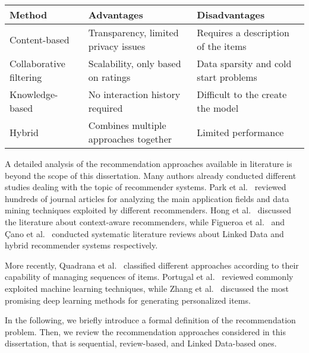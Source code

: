 \begin{table}
\centering
\begin{tabular}{@{}lp{4cm}p{4cm}@{}}
\toprule
Method & Advantages & Disadvantages \\ \midrule
Content-based & Transparency, limited privacy issues & Requires a description of the items \\
Collaborative filtering & Scalability, only based on ratings & Data sparsity and cold start problems \\
Knowledge-based & No interaction history required & Difficult to the create the model \\
Hybrid & Combines multiple approaches together & Limited performance \\ \bottomrule
\end{tabular}
\caption[Comparison of recommendation techniques]{}
\label{soa:tab:methods}
\end{table}

A detailed analysis of the recommendation approaches available in literature is beyond the scope of this dissertation. Many authors already conducted different studies dealing with the topic of recommender systems. Park et al.~\cite{Park2012} reviewed hundreds of journal articles for analyzing the main application fields and data mining techniques exploited by different recommenders. Hong et al.~\cite{Hong2009} discussed the literature about context-aware recommenders, while Figueroa et al.~\cite{Figueroa2015} and Çano et al.~\cite{Cano2017} conducted systematic literature reviews about Linked Data and hybrid recommender systems respectively.

More recently, Quadrana et al.~\cite{Quadrana2018} classified different approaches according to their capability of managing sequences of items. Portugal et al.~\cite{Portugal2018} reviewed commonly exploited machine learning techniques, while Zhang et al.~\cite{Zhang2019} discussed the most promising deep learning methods for generating personalized items.

In the following, we briefly introduce a formal definition of the recommendation problem. Then, we review the recommendation approaches considered in this dissertation, that is  sequential, review-based, and Linked Data-based ones. 

